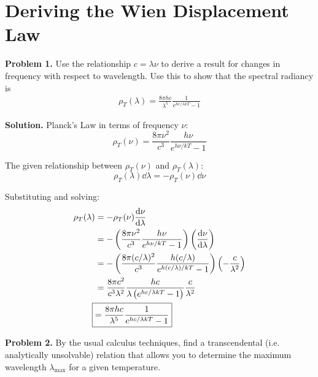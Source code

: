 \documentclass{article}
\begin{document}
\insertTitle

\section{Deriving the Wien Displacement Law}

\textbf{Problem 1.} Use the relationship $c = \lambda\nu$ to derive a result for changes in frequency with respect to wavelength. Use this to show that the spectral radiancy is
\begin{equation*}
\begin{aligned}
\rho_T(\lambda) = \frac{8\pi hc}{\lambda^5}\frac{1}{e^{hc/\lambda kT} - 1}
\end{aligned}
\end{equation*}

\textbf{Solution.} Planck's Law in terms of frequency $\nu$:
\begin{equation}
\rho_T(\nu) = \frac{8\pi\nu^2}{c^3}\frac{h\nu}{e^{h\nu/kT} - 1}
\end{equation}

The given relationship between $\rho_T(\nu)$ and $\rho_T(\lambda)$:
\begin{equation}
\rho_T(\lambda)\dd\lambda = -\rho_T(\nu)\dd\nu
\end{equation}

Substituting and solving:
\begin{equation*}
\begin{aligned}
\rho_T(\lambda) &= -\rho_T(\nu)\frac{\dd\nu}{\dd\lambda} \\
&= -\left(\frac{8\pi\nu^2}{c^3}\frac{h\nu}{e^{h\nu/kT} - 1}\right)\left(\frac{\dd\nu}{\dd\lambda}\right) \\
&= -\left(\frac{8\pi(c/\lambda)^2}{c^3}\frac{h(c/\lambda)}{e^{h(c/\lambda)/kT} - 1}\right)\left(-\frac{c}{\lambda^2}\right) \\
&= \frac{8\pi c^2}{c^3\lambda^2}\frac{hc}{\lambda\left(e^{hc/\lambda kT} - 1\right)}\frac{c}{\lambda^2} \\
\Aboxed{&= \frac{8\pi hc}{\lambda^5}\frac{1}{e^{hc/\lambda kT} - 1}}
\end{aligned}
\end{equation*}

\textbf{Problem 2.} By the usual calculus techniques, find a transcendental (i.e. analytically unsolvable) relation that allows you to determine the maximum wavelength $\lambda_{\text{max}}$ for a given temperature.
\end{document}

